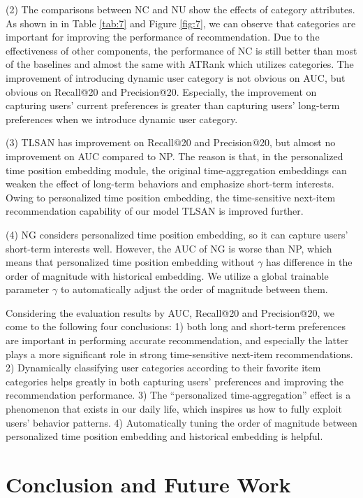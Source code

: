 \documentclass[preprint,12pt]{elsarticle}
\newcommand{\tool}{TLSAN\xspace}
\begin{document}
\begin{sloppypar}
(2) The comparisons between NC and NU show the effects of category attributes. As shown in in Table \ref{tab:7} and Figure \ref{fig:7}, we can observe that categories are important for improving the performance of recommendation. Due to the effectiveness of other components, the performance of NC is still better than most of the baselines and almost the same with ATRank which utilizes categories. The improvement of introducing dynamic user category is not obvious on AUC, but obvious on Recall@20 and Precision@20. Especially, the improvement on capturing users' current preferences is greater than capturing users' long-term preferences when we introduce dynamic user category.

(3) \tool has improvement on Recall@20 and Precision@20, but almost no improvement on AUC compared to NP. The reason is that, in the personalized time position embedding module, the original time-aggregation embeddings can weaken the effect of long-term behaviors and emphasize short-term interests. Owing to personalized time position embedding, the time-sensitive next-item recommendation capability of our model \tool is improved further. 

(4) NG considers personalized time position embedding, so it can capture users' short-term interests well. However, the AUC of NG is worse than NP, which means that personalized time position embedding without $\gamma$ has difference in the order of magnitude with historical embedding. We utilize a global trainable parameter $\gamma$ to automatically adjust the order of magnitude between them.

Considering the evaluation results by AUC, Recall@20 and Precision@20, we come to the following four conclusions: 1) both long and short-term preferences are important in performing accurate recommendation, and especially the latter plays a more significant role in strong time-sensitive next-item recommendations. 2) Dynamically classifying user categories according to their favorite item categories helps greatly in both capturing users' preferences and improving the recommendation performance. 3) The ``personalized time-aggregation'' effect is a phenomenon that exists in our daily life, which inspires us how to fully exploit users' behavior patterns. 4) Automatically tuning the order of magnitude between personalized time position embedding and historical embedding is helpful.

\section{Conclusion and Future Work}
\label{sec_conclusion_future}


\end{sloppypar}
\end{document}
